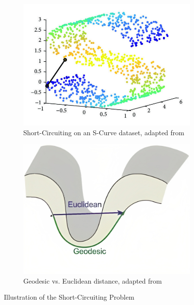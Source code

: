 \begin{figure}[!]
     \centering
     \begin{subfigure}[t]{0.55\columnwidth}
    	\centering
    	\includegraphics[width=\columnwidth]{images/short-circuit.jpg}
    	\caption{Short-Circuiting on an S-Curve dataset, adapted from \cite{short-circuit_fig}}
        \label{fig:short-circuit}
    \end{subfigure}
     \hfill
     \begin{subfigure}[t]{0.44\columnwidth}
    	\centering
    	\includegraphics[width=\columnwidth]{images/Geodesic-versus-Euclidean.jpg}
    	\caption{\textcolor{geodesic}{Geodesic} vs. \textcolor{euclidean}{Euclidean} distance, adapted from \cite{geo_vs_eucl}}
        \label{fig:Geodesic-versus-Euclidean}
    \end{subfigure}
     \caption[Problem of Short-Circuiting]{Illustration of the Short-Circuiting Problem}
    \label{fig:problem_short-circuiting}
\end{figure}

